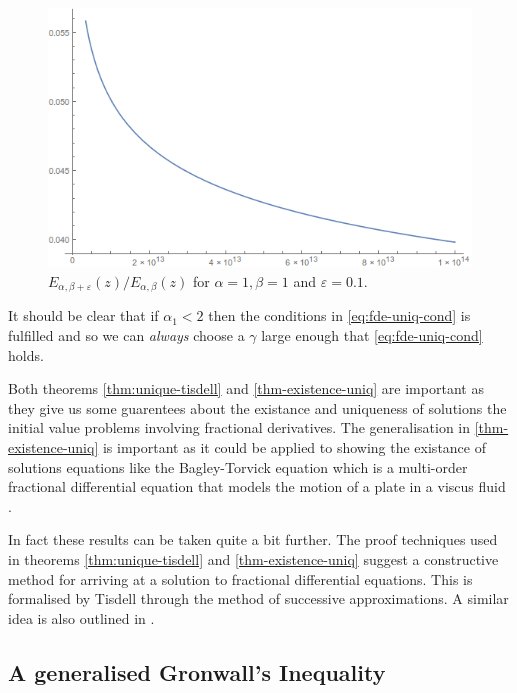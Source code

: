 \begin{figure}[H]
\includegraphics[scale=0.6]{images/Mittag-Leffler-Quotient}
\caption{$ E_{\alpha, \beta + \varepsilon}(z) / E_{\alpha, \beta}(z) $ for $ \alpha = 1, \beta = 1 $ and $ \varepsilon = 0.1 $.}
\label{fig:mittag-quotient}
\end{figure}

It should be clear that if $ \alpha_1 < 2 $ then the conditions in \ref{eq:fde-uniq-cond} is fulfilled and so we can \emph{always} choose a $ \gamma $ large enough that \eqref{eq:fde-uniq-cond} holds.


Both theorems \ref{thm:unique-tisdell} and \ref{thm-existence-uniq} are important as they give us some guarentees about the existance and uniqueness of solutions the initial value problems involving fractional derivatives. The generalisation in \ref{thm-existence-uniq} is important as it could be applied to showing the existance of solutions equations like the Bagley-Torvick equation which is a multi-order fractional differential equation that models the motion of a plate in a viscus fluid \cite{Diethelm2002-3, Podlubny1999, Torvik1984}.

In fact these results can be taken quite a bit further. The proof techniques used in theorems \ref{thm:unique-tisdell} and \ref{thm-existence-uniq} suggest a constructive method for arriving at a solution to fractional differential equations. This is formalised by Tisdell \cite{Tisdell2012} through the method of successive approximations. A similar idea is also outlined in \cite{Podlubny1999}.

\subsection{A generalised Gronwall's Inequality}

